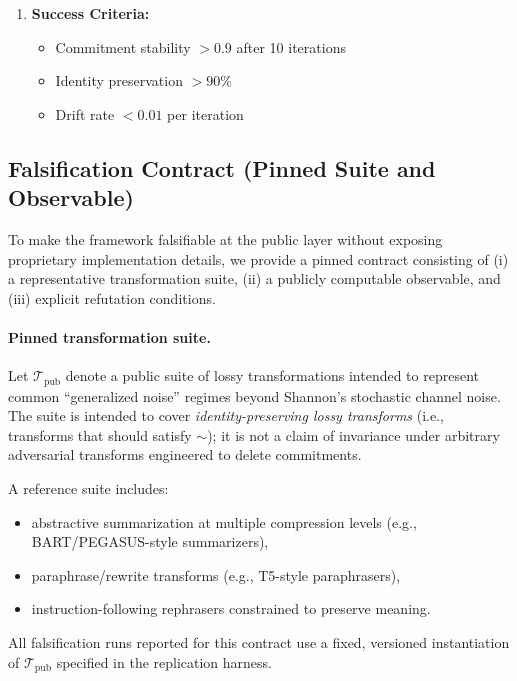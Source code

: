 \documentclass[11pt,a4paper]{article}
\begin{document}
\begin{enumerate}
    \item \textbf{Success Criteria:}
    \begin{itemize}
        \item Commitment stability $> 0.9$ after 10 iterations
        \item Identity preservation $> 90\%$
        \item Drift rate $< 0.01$ per iteration
    \end{itemize}
\end{enumerate}

\subsection{Falsification Contract (Pinned Suite and Observable)}

To make the framework falsifiable at the public layer without exposing proprietary implementation details, we provide a pinned contract consisting of (i) a representative transformation suite, (ii) a publicly computable observable, and (iii) explicit refutation conditions.

\paragraph{Pinned transformation suite.} Let $\mathcal{T}_{\mathrm{pub}}$ denote a public suite of lossy transformations intended to represent common ``generalized noise'' regimes beyond Shannon's stochastic channel noise. The suite is intended to cover \emph{identity-preserving lossy transforms} (i.e., transforms that should satisfy $\sim$); it is not a claim of invariance under arbitrary adversarial transforms engineered to delete commitments.

A reference suite includes:
\begin{itemize}
    \item abstractive summarization at multiple compression levels (e.g., BART/PEGASUS-style summarizers),
    \item paraphrase/rewrite transforms (e.g., T5-style paraphrasers),
    \item instruction-following rephrasers constrained to preserve meaning.
\end{itemize}
All falsification runs reported for this contract use a fixed, versioned instantiation of $\mathcal{T}_{\mathrm{pub}}$ specified in the replication harness.
\end{document}

